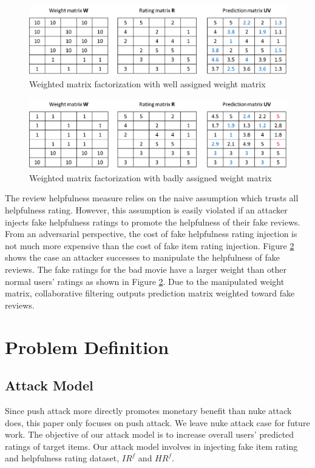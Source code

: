 \documentclass[master,english,final]{kaist-ucs}
\begin{document}
\begin{figure}[t]
    \centerline{\includegraphics[width=12.5cm]{figure/wmf_good}}
    \caption{  Weighted matrix factorization with well assigned weight matrix  } \label{wmf_good}
\end{figure}

\begin{figure}[t]
    \centerline{\includegraphics[width=12.5cm]{figure/wmf_bad}}
    \caption{  Weighted matrix factorization with badly assigned weight matrix  } \label{wmf_bad}
\end{figure}

The review helpfulness measure relies on the naive assumption which trusts all helpfulness rating.
However, this assumption is easily violated if an attacker injects fake helpfulness ratings to promote the helpfulness of their fake reviews.
From an adversarial perspective, the cost of fake helpfulness rating injection is not much more expensive than the cost of fake item rating injection.
Figure \ref{wmf_bad} shows the case an attacker successes to manipulate the helpfulness of fake reviews.
The fake ratings for the bad movie have a larger weight than other normal users' ratings as shown in Figure \ref{wmf_bad}.
Due to the manipulated weight matrix, collaborative filtering outputs prediction matrix weighted toward fake reviews.

\chapter{Problem Definition}

\section{Attack Model}
Since push attack more directly promotes monetary benefit than nuke attack does, this paper only focuses on push attack. We leave nuke attack case for future work. The objective of our attack model is to increase overall users’ predicted ratings of target items.
Our attack model involves in injecting fake item rating and helpfulness rating dataset, $IR^f$ and $HR^f$.
\end{document}
